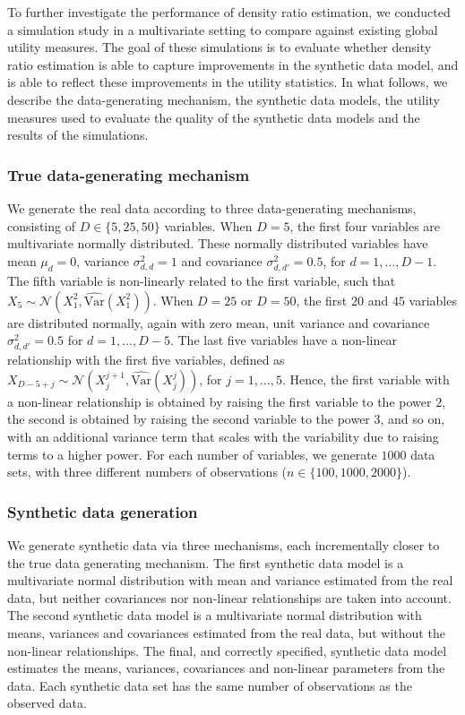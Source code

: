 \documentclass[
]{article}
\begin{document}
To further investigate the performance of density ratio estimation, we
conducted a simulation study in a multivariate setting to compare
against existing global utility measures. The goal of these simulations
is to evaluate whether density ratio estimation is able to capture
improvements in the synthetic data model, and is able to reflect these
improvements in the utility statistics. In what follows, we describe the
data-generating mechanism, the synthetic data models, the utility
measures used to evaluate the quality of the synthetic data models and
the results of the simulations.

\subsubsection{True data-generating
mechanism}\label{true-data-generating-mechanism}

We generate the real data according to three data-generating mechanisms,
consisting of \(D \in \{5, 25, 50\}\) variables. When \(D = 5\), the
first four variables are multivariate normally distributed. These
normally distributed variables have mean \(\mu_d = 0\), variance
\(\sigma^2_{d,d} = 1\) and covariance \(\sigma^2_{d,d'} = 0.5\), for
\(d = 1, \dots, D-1\). The fifth variable is non-linearly related to the
first variable, such that
\(X_5 \sim \mathcal{N}(X_1^2, \hat{\text{Var}}(X_1^2))\). When
\(D = 25\) or \(D = 50\), the first \(20\) and \(45\) variables are
distributed normally, again with zero mean, unit variance and covariance
\(\sigma^2_{d,d'} = 0.5\) for \(d = 1, \dots, D-5\). The last five
variables have a non-linear relationship with the first five variables,
defined as
\(X_{D-5+j} \sim \mathcal{N}(X_j^{j+1}, \hat{\text{Var}}(X_j^j))\), for
\(j = 1, \dots, 5\). Hence, the first variable with a non-linear
relationship is obtained by raising the first variable to the power
\(2\), the second is obtained by raising the second variable to the
power \(3\), and so on, with an additional variance term that scales
with the variability due to raising terms to a higher power. For each
number of variables, we generate \(1000\) data sets, with three
different numbers of observations (\(n \in \{100, 1000, 2000\}\)).

\subsubsection{Synthetic data
generation}\label{synthetic-data-generation}

We generate synthetic data via three mechanisms, each incrementally
closer to the true data generating mechanism. The first synthetic data
model is a multivariate normal distribution with mean and variance
estimated from the real data, but neither covariances nor non-linear
relationships are taken into account. The second synthetic data model is
a multivariate normal distribution with means, variances and covariances
estimated from the real data, but without the non-linear relationships.
The final, and correctly specified, synthetic data model estimates the
means, variances, covariances and non-linear parameters from the data.
Each synthetic data set has the same number of observations as the
observed data.
\end{document}
